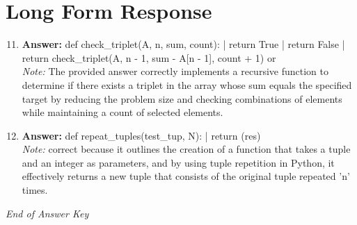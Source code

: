 \documentclass[12pt]{article}
\begin{document}
\section*{Long Form Response}
\begin{enumerate}[label=\arabic*.]
\setcounter{enumi}{10}
\item \textbf{Answer:} def check\_triplet(A, n, sum, count): | return True | return False | return check\_triplet(A, n - 1, sum - A[n - 1], count + 1) or\
\\ \textit{Note:} The provided answer correctly implements a recursive function to determine if there exists a triplet in the array whose sum equals the specified target by reducing the problem size and checking combinations of elements while maintaining a count of selected elements.
\item \textbf{Answer:} def repeat\_tuples(test\_tup, N): | return (res)
\\ \textit{Note:} correct because it outlines the creation of a function that takes a tuple and an integer as parameters, and by using tuple repetition in Python, it effectively returns a new tuple that consists of the original tuple repeated 'n' times.
\end{enumerate}

\vfill
\noindent\textit{End of Answer Key}
\end{document}
